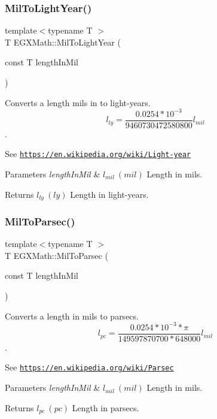 \subsubsection{\texorpdfstring{Mil\+To\+Light\+Year()}{MilToLightYear()}}
{\footnotesize\ttfamily template$<$typename T $>$ \\
T E\+G\+X\+Math\+::\+Mil\+To\+Light\+Year (\begin{DoxyParamCaption}\item[{const T}]{length\+In\+Mil }\end{DoxyParamCaption})}



Converts a length mils in to light-\/years. \[ l_{ly}=\frac{0.0254 * 10^{-3}}{9460730472580800} l_{mil} \]. 

See \href{https://en.wikipedia.org/wiki/Light-year}{\tt https\+://en.\+wikipedia.\+org/wiki/\+Light-\/year} 
\begin{DoxyParams}{Parameters}
{\em length\+In\+Mil} & $ l_{mil}\ (mil)$ Length in mils. \\
\hline
\end{DoxyParams}
\begin{DoxyReturn}{Returns}
$ l_{ly}\ (ly)$ Length in light-\/years. 
\end{DoxyReturn}
\mbox{\label{group___e_g_x_math-_conversions-_length_conversions-_imperial-_mil-_astronomical_gac188be8dcd6efe85bf8d39fe1f98c622}} 
\subsubsection{\texorpdfstring{Mil\+To\+Parsec()}{MilToParsec()}}
{\footnotesize\ttfamily template$<$typename T $>$ \\
T E\+G\+X\+Math\+::\+Mil\+To\+Parsec (\begin{DoxyParamCaption}\item[{const T}]{length\+In\+Mil }\end{DoxyParamCaption})}



Converts a length in mils to parsecs. \[ l_{pc}=\frac{0.0254 * 10^{-3} * \pi}{149597870700 * 648000} l_{mil} \]. 

See \href{https://en.wikipedia.org/wiki/Parsec}{\tt https\+://en.\+wikipedia.\+org/wiki/\+Parsec} 
\begin{DoxyParams}{Parameters}
{\em length\+In\+Mil} & $ l_{mil}\ (mil)$ Length in mils. \\
\hline
\end{DoxyParams}
\begin{DoxyReturn}{Returns}
$ l_{pc}\ (pc)$ Length in parsecs. 
\end{DoxyReturn}
